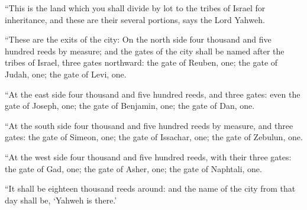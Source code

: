 {\par }{\PP {}“This is the land which you shall divide by lot to the tribes of Israel for inheritance, and these are their several portions, says the Lord Yahweh.
\par }{\PP {}“These are the exits of the city: On the north side four thousand and five hundred reeds by measure;
and the gates of the city shall be named after the tribes of Israel, three gates northward: the gate of Reuben, one; the gate of Judah, one; the gate of Levi, one.
\par }{\PP {}“At the east side four thousand and five hundred reeds, and three gates: even the gate of Joseph, one; the gate of Benjamin, one; the gate of Dan, one.
\par }{\PP {}“At the south side four thousand and five hundred reeds by measure, and three gates: the gate of Simeon, one; the gate of Issachar, one; the gate of Zebulun, one.
\par }{\PP {}“At the west side four thousand and five hundred reeds, with their three gates: the gate of Gad, one; the gate of Asher, one; the gate of Naphtali, one.
\par }{\PP {}“It shall be eighteen thousand reeds around: and the name of the city from that day shall be, ‘Yahweh is there.’
\par }